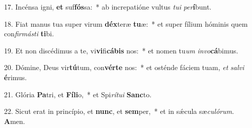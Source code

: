 17. Incénsa igni, \textbf{et} suf\textbf{fós}sa:~*  ab increpatióne vultus \textit{tu}\textit{i} \textit{per}\textbf{í}bunt.\

18. Fiat manus tua super virum \textbf{déx}teræ \textbf{tu}æ:~*  et super fílium hóminis quem con\textit{fir}\textit{más}\textit{ti} \textbf{ti}bi.\

19. Et non discédimus a te, vi\textbf{vi}fi\textbf{cá}\textbf{bis} nos:~*  et nomen tu\textit{um} \textit{in}\textit{vo}\textbf{cá}bimus.\

20. Dómine, Deus vir\textbf{tú}tum, con\textbf{vér}\textbf{te} nos:~*  et osténde fáciem tuam, \textit{et} \textit{sal}\textit{vi} \textbf{é}rimus.\

21. Glória \textbf{Pa}tri, et \textbf{Fí}\textbf{li}o,~*  et Spi\textit{rí}\textit{tu}\textit{i} \textbf{Sanc}to.\

22. Sicut erat in princípio, et \textbf{nunc}, et \textbf{sem}per,~*  et in sǽcula sæ\textit{cu}\textit{ló}\textit{rum}. \textbf{A}men.\

